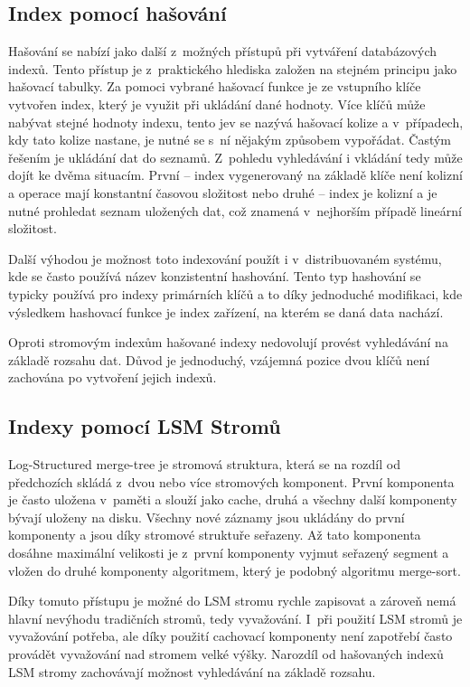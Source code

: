 \subsection{Index pomocí hašování}
Hašování se nabízí jako další z~možných přístupů při vytváření databázových indexů. Tento přístup je z~praktického hlediska založen na stejném principu jako hašovací tabulky. Za pomoci vybrané hašovací funkce je ze vstupního klíče vytvořen index, který je využit při ukládání dané hodnoty. Více klíčů může nabývat stejné hodnoty indexu, tento jev se nazývá hašovací kolize a v~případech, kdy tato kolize nastane, je nutné se s~ní nějakým způsobem vypořádat. Častým řešením je ukládání dat do seznamů. Z~pohledu vyhledávání i vkládání tedy může dojít ke dvěma situacím. První -- index vygenerovaný na základě klíče není kolizní a operace mají konstantní časovou složitost nebo druhé -- index je kolizní a je nutné prohledat seznam uložených dat, což znamená v~nejhorším případě lineární složitost.

Další výhodou je možnost toto indexování použít i v~distribuovaném systému, kde se často používá název konzistentní hashování. Tento typ hashování se typicky používá pro indexy primárních klíčů a to díky jednoduché modifikaci, kde výsledkem hashovací funkce je index zařízení, na kterém se daná data nachází.

Oproti stromovým indexům hašované indexy nedovolují provést vyhledávání na základě rozsahu dat. Důvod je jednoduchý, vzájemná pozice dvou klíčů není zachována po vytvoření jejich indexů.
\subsection{Indexy pomocí LSM Stromů}
Log-Structured merge-tree je stromová struktura, která se na rozdíl od předchozích skládá z~dvou nebo více stromových komponent. První komponenta je často uložena v~paměti a slouží jako cache, druhá a všechny další komponenty bývají uloženy na disku. Všechny nové záznamy jsou ukládány do první komponenty a jsou díky stromové struktuře seřazeny. Až tato komponenta dosáhne maximální velikosti je z~první komponenty vyjmut seřazený segment a vložen do druhé komponenty algoritmem, který je podobný algoritmu merge-sort. 

Díky tomuto přístupu je možné do LSM stromu rychle zapisovat a zároveň nemá hlavní nevýhodu tradičních stromů, tedy vyvažování. I~při použití LSM stromů je vyvažování potřeba, ale díky použití cachovací komponenty není zapotřebí často provádět vyvažování nad stromem velké výšky. Narozdíl od hašovaných indexů LSM stromy zachovávají možnost vyhledávání na základě rozsahu.

